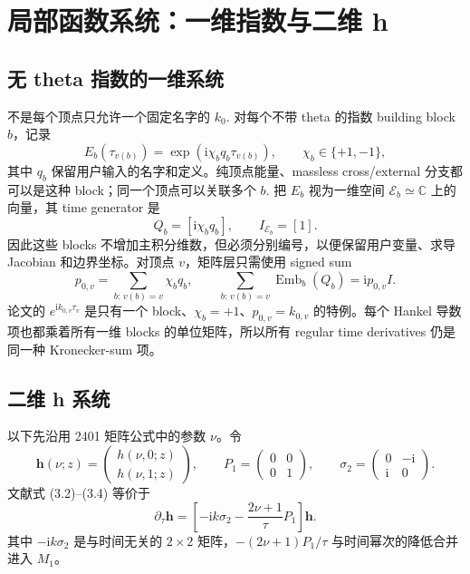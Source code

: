 \documentclass[11pt,a4paper]{ctexart}
\newcommand{\ii}{\mathrm i}
\newcommand{\cE}{\mathcal E}
\newcommand{\Emb}{\operatorname{Emb}}
\begin{document}
\section{局部函数系统：一维指数与二维 h}
\label{sec:local-function-system}

\subsection{无 theta 指数的一维系统}

不是每个顶点只允许一个固定名字的 $k_0$. 对每个不带 theta 的指数 building block $b$，记录
\begin{equation}
 E_b(\tau_{v(b)})
 =\exp\!\left(\ii\chi_bq_b\tau_{v(b)}\right),
 \qquad \chi_b\in\{+1,-1\},
 \label{eq:phase-exponent-block}
\end{equation}
其中 $q_b$ 保留用户输入的名字和定义。纯顶点能量、massless cross/external 分支都可以是这种 block；同一个顶点可以关联多个 $b$. 把 $E_b$ 视为一维空间 $\cE_b\simeq\mathbb C$ 上的向量，其 time generator 是
\begin{equation}
 Q_b=[\ii\chi_bq_b],
 \qquad I_{\cE_b}=[1].
 \label{eq:exponential-1d}
\end{equation}
因此这些 blocks 不增加主积分维数，但必须分别编号，以便保留用户变量、求导 Jacobian 和边界坐标。对顶点 $v$，矩阵层只需使用 signed sum
\begin{equation}
 p_{0,v}=\sum_{b:\,v(b)=v}\chi_bq_b,
 \qquad
 \sum_{b:\,v(b)=v}\Emb_b(Q_b)=\ii p_{0,v}I.
 \label{eq:vertex-signed-phase-energy}
\end{equation}
论文的 $e^{\ii k_{0,v}\tau_v}$ 是只有一个 block、$\chi_b=+1$、$p_{0,v}=k_{0,v}$ 的特例。每个 Hankel 导数项也都乘着所有一维 blocks 的单位矩阵，所以所有 regular time derivatives 仍是同一种 Kronecker-sum 项。

\subsection{二维 h 系统}

以下先沿用 2401 矩阵公式中的参数 $\nu$。令
\begin{equation}
 \bm h(\nu;z)=
 \begin{pmatrix}h(\nu,0;z)\\h(\nu,1;z)\end{pmatrix},
 \qquad
 P_1=\begin{pmatrix}0&0\\0&1\end{pmatrix},
 \qquad
 \sigma_2=\begin{pmatrix}0&-\ii\\ \ii&0\end{pmatrix}.
\end{equation}
文献式 (3.2)--(3.4) 等价于
\begin{equation}
 \partial_\tau\bm h
 =\left[-\ii k\sigma_2-\frac{2\nu+1}{\tau}P_1\right]\bm h.
 \label{eq:h-first-order-system}
\end{equation}
其中 $-\ii k\sigma_2$ 是与时间无关的 $2\times2$ 矩阵，$-(2\nu+1)P_1/\tau$ 与时间幂次的降低合并进入 $M_1$。
\end{document}
